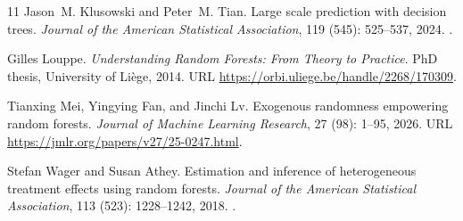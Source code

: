 \documentclass[12pt]{article}
\begin{document}
\begin{thebibliography}{11}
Jason~M. Klusowski and Peter~M. Tian.
\newblock Large scale prediction with decision trees.
\newblock \emph{Journal of the American Statistical Association}, 119 (545): 525--537, 2024.
\newblock {}.

Gilles Louppe.
\newblock \emph{Understanding Random Forests: From Theory to Practice}.
\newblock PhD thesis, University of Li\`ege, 2014.
\newblock URL \url{https://orbi.uliege.be/handle/2268/170309}.

Tianxing Mei, Yingying Fan, and Jinchi Lv.
\newblock Exogenous randomness empowering random forests.
\newblock \emph{Journal of Machine Learning Research}, 27 (98): 1--95, 2026.
\newblock URL \url{https://jmlr.org/papers/v27/25-0247.html}.

Stefan Wager and Susan Athey.
\newblock Estimation and inference of heterogeneous treatment effects using random forests.
\newblock \emph{Journal of the American Statistical Association}, 113 (523): 1228--1242, 2018.
\newblock {}.

\end{thebibliography}
\endgroup
\end{document}
